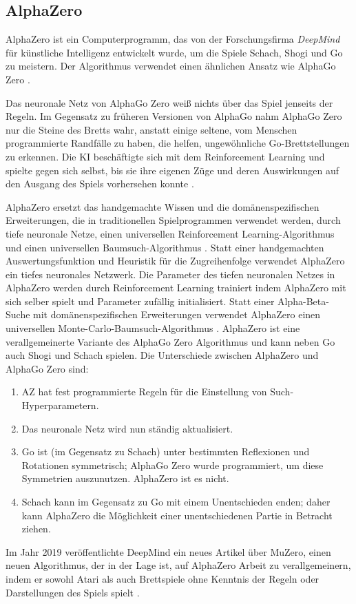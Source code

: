 \subsection{AlphaZero}
AlphaZero ist ein Computerprogramm, das von der Forschungsfirma \textit{DeepMind} für künstliche Intelligenz entwickelt wurde, um die Spiele Schach, Shogi und Go zu meistern. Der Algorithmus verwendet einen ähnlichen Ansatz wie AlphaGo Zero \cite{SilverHubert2017}. 


Das neuronale Netz von AlphaGo Zero weiß nichts über das Spiel jenseits der Regeln. Im Gegensatz zu früheren Versionen von AlphaGo nahm AlphaGo Zero nur die Steine des Bretts wahr, anstatt einige seltene, vom Menschen programmierte Randfälle zu haben, die helfen, ungewöhnliche Go-Brettstellungen zu erkennen. Die KI beschäftigte sich mit dem Reinforcement Learning und spielte gegen sich selbst, bis sie ihre eigenen Züge und deren Auswirkungen auf den Ausgang des Spiels vorhersehen konnte \cite{Greenemeier2017}.


AlphaZero ersetzt das handgemachte Wissen und die domänenspezifischen Erweiterungen, die in traditionellen Spielprogrammen verwendet werden, durch tiefe neuronale Netze, einen universellen Reinforcement Learning-Algorithmus und einen universellen Baumsuch-Algorithmus \cite{Silver2018}. 
Statt einer handgemachten Auswertungsfunktion und Heuristik für die Zugreihenfolge verwendet AlphaZero ein tiefes neuronales Netzwerk. Die Parameter des tiefen neuronalen Netzes in AlphaZero werden durch Reinforcement Learning trainiert indem AlphaZero mit sich selber spielt und Parameter zufällig initialisiert. Statt einer Alpha-Beta-Suche mit domänenspezifischen Erweiterungen verwendet AlphaZero einen universellen Monte-Carlo-Baumsuch-Algorithmus \cite{Silver2018}. AlphaZero ist eine verallgemeinerte Variante des AlphaGo Zero Algorithmus und kann neben Go auch Shogi und Schach spielen. Die Unterschiede zwischen AlphaZero und AlphaGo Zero sind: \cite{Silver2018}
\begin{enumerate}
	\item AZ hat fest programmierte Regeln für die Einstellung von Such-Hyperparametern.
	\item Das neuronale Netz wird nun ständig aktualisiert.
	\item Go ist (im Gegensatz zu Schach) unter bestimmten Reflexionen und Rotationen symmetrisch; AlphaGo Zero wurde programmiert, um diese Symmetrien auszunutzen. AlphaZero ist es nicht.
	\item Schach kann im Gegensatz zu Go mit einem Unentschieden enden; daher kann AlphaZero die Möglichkeit einer unentschiedenen Partie in Betracht ziehen.
\end{enumerate}
Im Jahr 2019 veröffentlichte DeepMind ein neues Artikel über MuZero, einen neuen Algorithmus, der in der Lage ist, auf AlphaZero Arbeit zu verallgemeinern, indem er sowohl Atari als auch Brettspiele ohne Kenntnis der Regeln oder Darstellungen des Spiels spielt \cite{Silver_2019}. 





